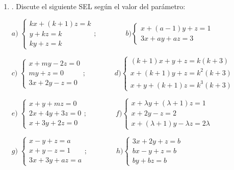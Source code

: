 \begin{enumerate}




\item. Discute el siguiente SEL según el valor del parámetro:

$a)\; \begin{cases} kx+(k+1)z=k\\y+kz=k\\ky+z=k   \end{cases}; \qquad \qquad b) \begin{cases}  x+(a-1)y+z=1\\3x+ay+az=3  \end{cases}$

$c)\; \begin{cases} x+my-2z=0\\my+z=0\\3x+2y-z=0  \end{cases}; \qquad \qquad d) \begin{cases} (k+1)x+y+z=k(k+3)\\x+(k+1)y+z=k^2(k+3)\\x+y+(k+1)z=k^3(k+3)    \end{cases}$

$e)\; \begin{cases}  x+y+mz=0\\2x+4y+3z=0\\x+3y+2z=0  \end{cases}; \qquad \qquad f) \begin{cases}  x+\lambda y+ (\lambda + 1 )z=1\\x+2y-z=2\\x+(\lambda+1)y-\lambda z=2\lambda  \end{cases}$

$g)\; \begin{cases}  x-y+z=a\\x+y-z=1\\3x+3y+az=a  \end{cases}; \qquad \qquad h) \begin{cases}  3x+2y+z=b\\bx-y+z=b\\by+bz=b  \end{cases}$


\end{enumerate}

